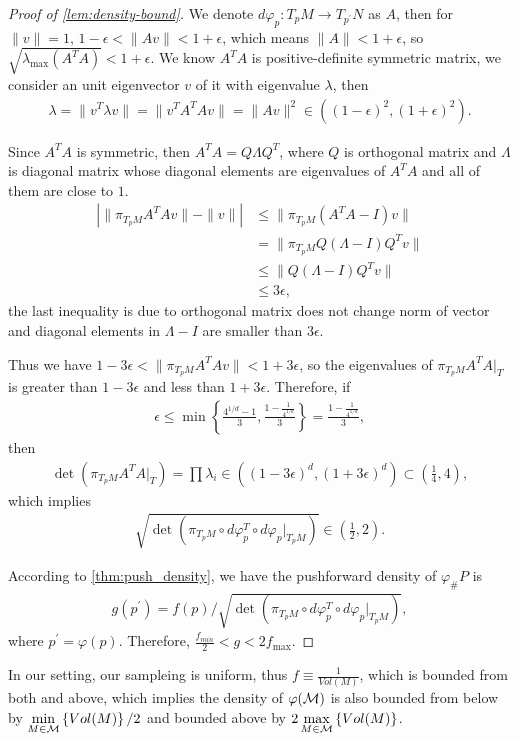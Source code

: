 \begin{proof}[Proof of \cref{lem:density-bound}]
We denote $d\varphi_p:T_p M \rightarrow T_{p^\prime} N$ as $A$, then for $\|v\|=1$, $1-\epsilon<\|Av\|<1+\epsilon$, which means $\|A\|<1+\epsilon$, so $\sqrt{\lambda_{\max}(A^T A)}<1+\epsilon$. We know $A^T A$ is positive-definite  symmetric matrix, we consider an unit eigenvector $v$ of it with eigenvalue $\lambda$, then 
\begin{align}
	\lambda=\|v^T \lambda v\|= \|v^T A^T A v\|=\|Av\|^2\in ((1-\epsilon)^2,(1+\epsilon)^2).
\end{align}

Since $A^TA$ is symmetric, then $A^T A=Q\Lambda Q^T$,  where $Q$ is orthogonal matrix and $\Lambda$ is diagonal matrix whose diagonal elements are eigenvalues of $A^T A$ and all of them are close to $1$.
\begin{align}
	|\|\pi_{T_p M} A^T A v\|-\|v\||&\leq \|\pi_{T_p M}(A^T A -I) v\|\\
	&=\|\pi_{T_p M} Q(\Lambda-I)Q^T v\|\\
	&\leq \|Q(\Lambda-I)Q^T v\|\\
	&\leq 3\epsilon,
\end{align}
the last inequality is due to orthogonal matrix does not change norm of vector and diagonal elements in $\Lambda-I$ are smaller than $3\epsilon$.

Thus we have $1-3\epsilon <\|\pi_{T_p M} A^T A v\|<1+3\epsilon $, so the eigenvalues of $\pi_{T_p M} A^T A|_T$ is greater than $1-3\epsilon$ and less than $1+3\epsilon$. Therefore, if 
\begin{align}
	\label{range_of_e}
	\epsilon \leq \min\left\{\frac{4^{1/d}-1}{3},\frac{1-\frac{1}{4^{1/d}}}{3}\right\} = \frac{1-\frac{1}{4^{1/d}}}{3},
\end{align}
then
\begin{align}
	\det (\pi_{T_p M} A^T A|_T)=\prod \lambda_i\in ((1-3\epsilon)^d,(1+3\epsilon)^d)\subset(\frac{1}{4},4),
\end{align}
which implies
\begin{align}
	\sqrt{\det \left(\pi_{T_p M} \circ d\varphi_p^T \circ d\varphi_p |_{T_pM}\right)} \in (\frac{1}{2},2).
\end{align}

According to \cref{thm:push_density}, we have the pushforward density of $\varphi_\# P$ is 
	\begin{align}
	g(p^\prime)=f(p)/\sqrt{\det \left(\pi_{T_p M} \circ d\varphi_p^T \circ d\varphi_p |_{T_pM}\right)},
\end{align}
where $p^\prime = \varphi(p)$. Therefore, $\frac{f_{min}}{2}<g<2f_{\max}$.
\end{proof}

In our setting, our sampleing is uniform, thus $f \equiv \frac{1}{Vol(M)}$, which is bounded from both and above, which implies the density of $\varphi(\mathcal{M})$ is also bounded from below by $\min\limits_{M \in \mathcal{M}} \left\{Vol(M)\right\}/2$ and bounded above by $2\max\limits_{M \in \mathcal{M}} \left\{Vol(M)\right\}$.
